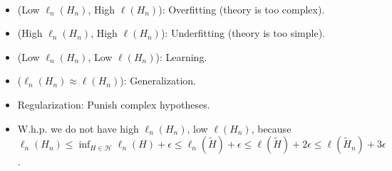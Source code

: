 \documentclass[8pt,a4paper]{extarticle}
\newenvironment{topic}[1]
{\textbf{\sffamily \colorbox{black}{\rlap{\textbf{\textcolor{white}{#1}}}\hspace{\linewidth}\hspace{-2\fboxsep}}} \\ \vspace{0.2cm}}
{}
\begin{document}
\begin{multicols*}{2}
\begin{topic}{Risk minimization}
\begin{itemize}
\begin{itemize}
                      \item (Low $\ell_n(H_n)$, High $\ell(H_n)$): Overfitting (theory is too complex).
                      \item (High $\ell_n(H_n)$, High $\ell(H_n)$): Underfitting (theory is too simple).
                      \item (Low $\ell_n(H_n)$, Low $\ell(H_n)$): Learning.
                      \item ($\ell_n(H_n) \approx \ell(H_n)$): Generalization.
                      \item Regularization: Punish complex hypotheses.
                      \item W.h.p. we do not have high $\ell_n(H_n)$, low $\ell(H_n)$, because $\ell_n(H_n) \leq \inf_{H \in
                                    \mathcal{H}} \ell_n(H) + \epsilon \leq \ell_n(\tilde{H}) + \epsilon \leq \ell(\tilde{H}) + 2
                                \epsilon \leq \ell(\tilde{H}_n) + 3 \epsilon$.
                  \end{itemize}
        \end{itemize}
    \end{topic}


\end{multicols*}
\end{document}
